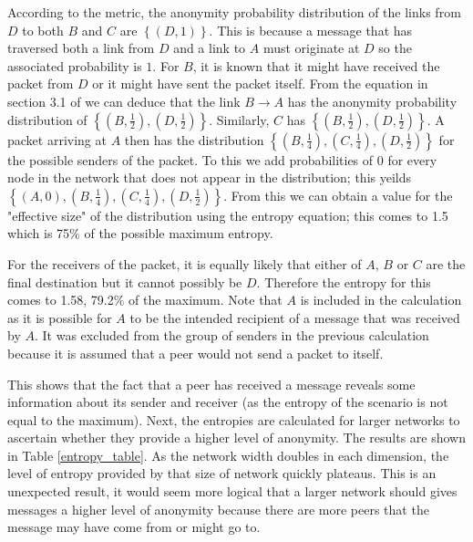 \documentclass[ %
                    author={Luke Murray},
                supervisor={Dr. Simon Hollis},
                     title={Shadow Peer-to-Peer Networks},
                  subtitle={},
                    degree={MEng},
                      year={2013} ]{thesis}
\begin{document}
According to the metric, the anonymity probability distribution of the links from $D$ to both $B$ and $C$ are $\left\{(D, 1)\right\}$. This is because a message that has traversed both a link from $D$ and a link to $A$ must originate at $D$ so the associated probability is $1$. For $B$, it is known that it might have received the packet from $D$ or it might have sent the packet itself. From the equation in section 3.1 of \cite{serjantov2003towards} we can deduce that the link $B \rightarrow A$ has the anonymity probability distribution of $\left\{(B, \frac{1}{2}), (D, \frac{1}{2})\right\}$. Similarly, $C$ has $\left\{(B, \frac{1}{2}), (D, \frac{1}{2})\right\}$. A packet arriving at $A$ then has the distribution $\left\{(B, \frac{1}{4}), (C, \frac{1}{4}), (D, \frac{1}{2})\right\}$ for the possible senders of the packet. To this we add probabilities of 0 for every node in the network that does not appear in the distribution; this yeilds $\left\{(A, 0), (B, \frac{1}{4}), (C, \frac{1}{4}), (D, \frac{1}{2})\right\}$. From this we can obtain a value for the "effective size" of the distribution using the entropy equation; this comes to 1.5 which is 75\% of the possible maximum entropy.

For the receivers of the packet, it is equally likely that either of $A$, $B$ or $C$ are the final destination but it cannot possibly be $D$. Therefore the entropy for this comes to 1.58, 79.2\% of the maximum. Note that $A$ is included in the calculation as it is possible for $A$ to be the intended recipient of a message that was received by $A$. It was excluded from the group of senders in the previous calculation because it is assumed that a peer would not send a packet to itself.

This shows that the fact that a peer has received a message reveals some information about its sender and receiver (as the entropy of the scenario is not equal to the maximum). Next, the entropies are calculated for larger networks to ascertain whether they provide a higher level of anonymity. The results are shown in Table \ref{entropy_table}. As the network width doubles in each dimension, the level of entropy provided by that size of network quickly plateaus. This is an unexpected result, it would seem more logical that a larger network should gives messages a higher level of anonymity because there are more peers that the message may have come from or might go to.

\end{document}
